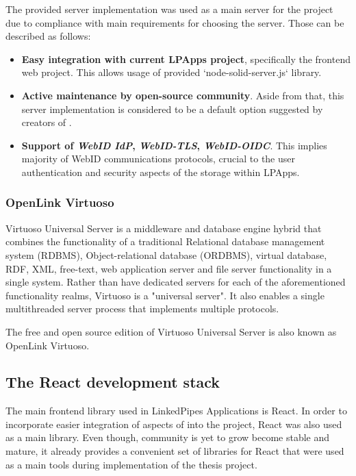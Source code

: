 The provided server implementation was used as a main \solid{} server for the project due to compliance with main requirements for choosing the server. Those can be described as follows:
\begin{itemize}
	\item \textbf{Easy integration with current LPApps project}, specifically the frontend web project. This allows usage of provided `node-solid-server.js` library.
    \item \textbf{Active maintenance by open-source community}. Aside from that, this server implementation is considered to be a default option suggested by creators of \solid{}.
    \item \textbf{Support of \textit{WebID IdP}, \textit{WebID-TLS}, \textit{WebID-OIDC}}. This implies majority of WebID communications protocols,
    crucial to the user authentication and security aspects of the storage within LPApps.
\end{itemize}

\subsubsection{OpenLink Virtuoso}

Virtuoso Universal Server is a middleware and database engine hybrid that combines the functionality of a traditional Relational database management system (RDBMS), Object-relational database (ORDBMS), virtual database, RDF, XML, free-text, web application server and file server functionality in a single system. Rather than have dedicated servers for each of the aforementioned functionality realms, Virtuoso is a "universal server". It also enables a single multithreaded server process that implements multiple protocols.

The free and open source edition of Virtuoso Universal Server is also known as OpenLink Virtuoso.

\subsection{The \solid{} React development stack}

The main frontend library used in LinkedPipes Applications is React. In order to incorporate easier integration of aspects of \solid{} into the project, React was also used as a main library. Even though, \solid{} community is yet to grow become stable and mature, it already provides a convenient set of libraries for React that were used as a main tools during implementation of the thesis project. 

